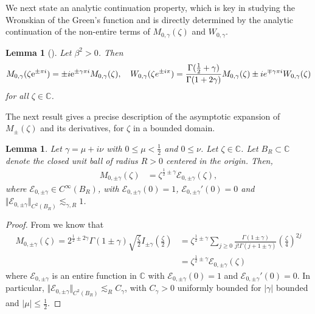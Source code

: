 \documentclass[11pt,reqno]{amsproc}
\newtheorem{lemma}[proposition]{Lemma}
\theoremstyle{definition}
\numberwithin{equation}{section}
\newcommand{\C}{{\mathbb C}}
\newcommand{\E}{{\mathcal E}}
\newcommand\e{{\rm e}}
\renewcommand{\b}{\beta}
\begin{document}
We next state an analytic continuation property, which is key in studying the Wronskian of the Green's function and is directly determined by the analytic continuation of the non-entire terms of $M_{0,\gamma}(\zeta)$ and $W_{0,\gamma}$. 

\begin{lemma}[\cite{NIST}]\label{lemma:analyticcontinuation}
Let $\b^2>0$. Then
\begin{equation*}
M_{0,\gamma}(\zeta \e^{\pm \pi i}) = \pm i \e^{\pm \gamma \pi i}M_{0,\gamma}(\zeta), \quad W_{0,\gamma}(\zeta e^{\pm i\pi})=\frac{\Gamma(\tfrac12 + \gamma)}{\Gamma(1+2\gamma)} M_{0,\gamma}(\zeta) \pm i e^{\mp \gamma\pi i}W_{0,\gamma}(\zeta)
\end{equation*}
for all $\zeta\in\C$.
\end{lemma}


The next result gives a precise description of the asymptotic expansion of $M_\pm(\zeta)$ and its derivatives, for $\zeta$ in a bounded domain. 
\begin{lemma}\label{lemma:asymptoticexpansionM}
Let $\gamma=\mu + i\nu$ with $0\leq \mu < \frac12$ and $0\leq \nu$. Let $\zeta\in\C$. Let $B_R\subset\C$ denote the closed unit ball of radius $R>0$ centered in the origin. Then,
\begin{equation*}
\begin{aligned}
M_{0,\pm\gamma}(\zeta)&=\zeta^{\frac12 \pm\gamma}\mathcal{E}_{0,\pm\gamma}(\zeta),
\end{aligned}
\end{equation*}
where $\mathcal{E}_{0,\pm\gamma}\in C^\infty(B_R)$, with $\E_{0,\pm\gamma}(0) =1$,  $\E_{0,\pm\gamma}'(0)=0$ and $\Vert \mathcal{E}_{0,\pm\gamma}\Vert_{C^2(B_R)} \lesssim_{\gamma,R} 1$.
\end{lemma}

\begin{proof}
From \cite{NIST} we know that
\begin{align*}
M_{0,\pm \gamma}(\zeta) = 2^{\frac12\pm 2\gamma}\Gamma(1\pm \gamma) \sqrt{\tfrac{\zeta}{2}} I_{\pm \gamma} (\tfrac{\zeta}{2}) &= \zeta^{\frac12\pm \gamma} \sum_{j\geq 0} \frac{\Gamma(1\pm \gamma)}{j! \Gamma(j+1 \pm \gamma)}\left( \tfrac{\zeta}{4}\right)^{2j} \\
&= \zeta^{\frac12\pm \gamma} \E_{0,\pm \gamma}(\zeta)
\end{align*}
where $\E_{0,\pm\gamma}$ is an entire function in $\C$ with $\E_{0,\pm\gamma}(0) = 1$ and $\E_{0,\pm\gamma}'(0)=0$. In particular,  $\Vert \mathcal{E}_{0,\pm\gamma}\Vert_{C^2(B_R)} \lesssim_{R} C_\gamma$, with $C_\gamma>0$ uniformly bounded for $|\gamma|$ bounded and $|\mu|\leq\frac12$. 
\end{proof}
\end{document}
